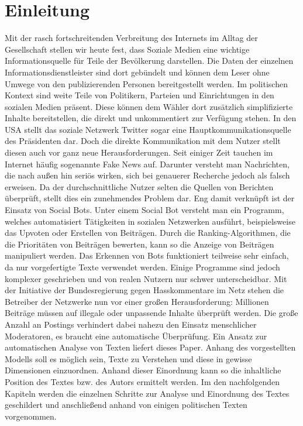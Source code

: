 

\section{Einleitung}
Mit der rasch fortschreitenden Verbreitung des Internets im Alltag der Gesellschaft stellen wir heute fest, dass Soziale Medien eine wichtige Informationsquelle für Teile der Bevölkerung darstellen. Die Daten der einzelnen Informationsdienstleister sind dort gebündelt und können dem Leser ohne Umwege von den publizierenden Personen bereitgestellt werden. Im politischen Kontext sind weite Teile von Politikern, Parteien und Einrichtungen in den sozialen Medien präsent. Diese können dem Wähler dort zusätzlich simplifizierte Inhalte bereitstellen, die direkt und unkommentiert zur Verfügung stehen. In den USA stellt das soziale Netzwerk Twitter sogar eine Hauptkommunikationsquelle des Präsidenten dar.
\newline
Doch die direkte Kommunikation mit dem Nutzer stellt diesen auch vor ganz neue Herausforderungen. Seit einiger Zeit tauchen im Internet häufig sogenannte Fake News auf. Darunter versteht man Nachrichten, die nach außen hin seriös wirken, sich bei genauerer Recherche jedoch als falsch erweisen. Da der durchschnittliche Nutzer selten die Quellen von Berichten überprüft, stellt dies ein zunehmendes Problem dar. Eng damit verknüpft ist der Einsatz von Social Bots. Unter einem Social Bot versteht man ein Programm, welches automatisiert Tätigkeiten in sozialen Netzwerken ausführt, beispielsweise das Upvoten oder Erstellen von Beiträgen. Durch die Ranking-Algorithmen, die die Prioritäten von Beiträgen bewerten, kann so die Anzeige von Beiträgen manipuliert werden. Das Erkennen von Bots funktioniert teilweise sehr einfach, da nur vorgefertigte Texte verwendet werden. Einige Programme sind jedoch komplexer geschrieben und von realen Nutzern nur schwer unterscheidbar.
\newline
Mit der Initiative der Bundesregierung gegen Hasskommentare im Netz stehen die Betreiber der Netzwerke nun vor einer großen Herausforderung: Millionen Beiträge müssen auf illegale oder unpassende Inhalte überprüft werden. Die große Anzahl an Postings verhindert dabei nahezu den Einsatz menschlicher Moderatoren, es braucht eine automatische Überprüfung. Ein Ansatz zur automatischen Analyse von Texten liefert dieses Paper. Anhang des vorgestellten Modells soll es möglich sein, Texte zu Verstehen und diese in gewisse Dimensionen einzuordnen. Anhand dieser Einordnung kann so die inhaltliche Position des Textes bzw. des Autors ermittelt werden. Im den nachfolgenden Kapiteln werden die einzelnen Schritte zur Analyse und Einordnung des Textes geschildert und anschließend anhand von einigen politischen Texten vorgenommen.

